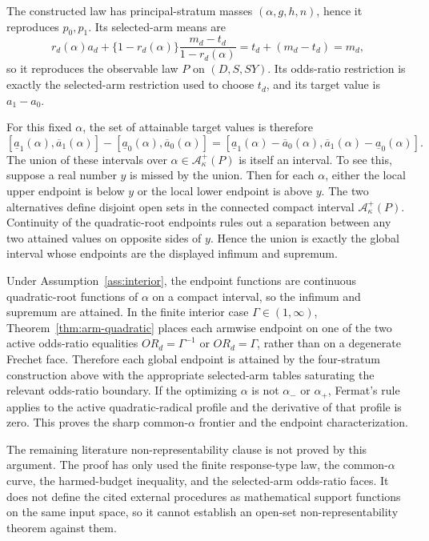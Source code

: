 \documentclass[11pt]{article}
\theoremstyle{definition}
\theoremstyle{plain}
\theoremstyle{remark}
\begin{document}
The constructed law has principal-stratum masses \((\alpha,g,h,n)\), hence it
reproduces \(p_0,p_1\).  Its selected-arm means are
\[
  r_d(\alpha)a_d+\{1-r_d(\alpha)\}
  \frac{m_d-t_d}{1-r_d(\alpha)}
  =
  t_d+(m_d-t_d)
  =
  m_d,
\]
so it reproduces the observable law \(P\) on \((D,S,SY)\).  Its odds-ratio
restriction is exactly the selected-arm restriction used to choose \(t_d\), and
its target value is \(a_1-a_0\).

For this fixed \(\alpha\), the set of attainable target values is therefore
\[
  [\underline a_1(\alpha),\overline a_1(\alpha)]
  -
  [\underline a_0(\alpha),\overline a_0(\alpha)]
  =
  [\underline a_1(\alpha)-\overline a_0(\alpha),
   \overline a_1(\alpha)-\underline a_0(\alpha)].
\]
The union of these intervals over \(\alpha\in\mathcal A_\kappa^+(P)\) is itself
an interval.  To see this, suppose a real number \(y\) is missed by the union.
Then for each \(\alpha\), either the local upper endpoint is below \(y\) or the
local lower endpoint is above \(y\).  The two alternatives define disjoint open
sets in the connected compact interval \(\mathcal A_\kappa^+(P)\).  Continuity
of the quadratic-root endpoints rules out a separation between any two
attained values on opposite sides of \(y\).  Hence the union is exactly the
global interval whose endpoints are the displayed infimum and supremum.

Under Assumption~\ref{ass:interior}, the endpoint functions are continuous
quadratic-root functions of \(\alpha\) on a compact interval, so the infimum
and supremum are attained.  In the finite interior case \(\Gamma\in(1,\infty)\),
Theorem~\ref{thm:arm-quadratic} places each armwise endpoint on one of the two
active odds-ratio equalities \(OR_d=\Gamma^{-1}\) or \(OR_d=\Gamma\), rather
than on a degenerate Frechet face.  Therefore each global endpoint is attained
by the four-stratum construction above with the appropriate selected-arm
tables saturating the relevant odds-ratio boundary.  If the optimizing
\(\alpha\) is not \(\alpha_-\) or \(\alpha_+\), Fermat's rule applies to the
active quadratic-radical profile and the derivative of that profile is zero.
This proves the sharp common-\(\alpha\) frontier and the endpoint
characterization.

The remaining literature non-representability clause is not proved by this
argument.  The proof has only used the finite response-type law, the
common-\(\alpha\) curve, the harmed-budget inequality, and the selected-arm
odds-ratio faces.  It does not define the cited external procedures as
mathematical support functions on the same input space, so it cannot establish
an open-set non-representability theorem against them.
\end{document}
